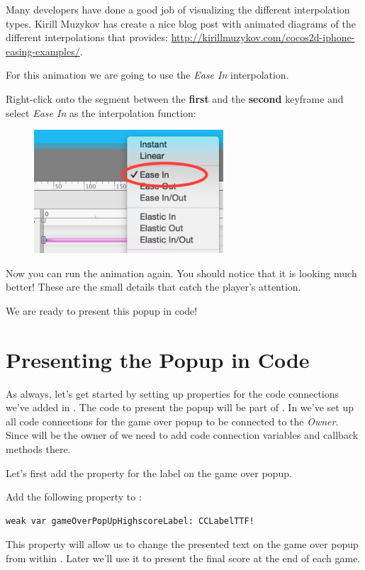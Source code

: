 Many developers have done a good job of visualizing the different interpolation
types. Kirill Muzykov has create a nice blog post with animated diagrams of the
different interpolations that \cocos{} provides:
\url{http://kirillmuzykov.com/cocos2d-iphone-easing-examples/}.

For this animation we are going to use the \textit{Ease In} interpolation.

\begin{leftbar}
Right-click onto the segment between the \textbf{first} and the \textbf{second}
keyframe and select \textit{Ease In} as the interpolation function:
\begin{figure}[H]
    \centering
    \includegraphics[width=200pt]{images/Chapter7/timeline_ease_in.png}
\end{figure}
\end{leftbar}

Now you can run the animation again. You should notice that it is looking much
better! These are the small details that catch the player's attention.

We are ready to present this popup in code!

\section{Presenting the Popup in Code}

As always, let's get started by setting up properties for the code connections
we've added in \SB{}. The code to present the popup will be part of 
. In \SB{} we've set up all code connections for the game
over popup to be connected to the \textit{Owner}. Since 
will be the owner of  we need to add code connection
variables and callback methods there.

Let's first add the property for the label on the game over popup.
\begin{leftbar}
Add the following property to :
\begin{lstlisting}
weak var gameOverPopUpHighscoreLabel: CCLabelTTF!
\end{lstlisting}
\end{leftbar}
This property will allow us to change the presented text on the game over popup
from within . Later we'll use it to present the final
score at the end of each game.

